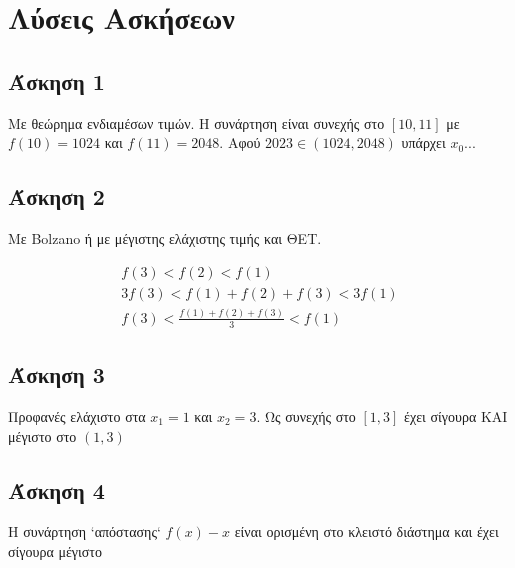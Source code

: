 \documentclass[greek]{beamer}
\begin{document}
\appendix
\section{Λύσεις Ασκήσεων}
\begin{frame}
      \tableofcontents
\end{frame}

\subsection{Άσκηση 1}
\begin{frame}[label=Λύση1]
      Με θεώρημα ενδιαμέσων τιμών. Η συνάρτηση είναι συνεχής στο $[10,11]$ με $f(10)=1024$ και $f(11)=2048$. Αφού $2023\in (1024,2048)$ υπάρχει $x_0$...

      \hyperlink{Άσκηση1}{}
\end{frame}

\subsection{Άσκηση 2}
\begin{frame}[label=Λύση2]
      Με Bolzano ή με μέγιστης ελάχιστης τιμής και ΘΕΤ.

      \begin{gather*}
            f(3)<f(2)<f(1) \\
            3f(3)<f(1)+f(2)+f(3)<3f(1) \\
            f(3)<\frac{f(1)+f(2)+f(3)}{3}<f(1)
      \end{gather*}

      \hyperlink{Άσκηση2}{}
\end{frame}

\subsection{Άσκηση 3}
\begin{frame}[label=Λύση3]
      Προφανές ελάχιστο στα $x_1=1$ και $x_2=3$. Ως συνεχής στο $[1,3]$ έχει σίγουρα ΚΑΙ μέγιστο στο $(1,3)$

      \hyperlink{Άσκηση3}{}
\end{frame}

\subsection{Άσκηση 4}
\begin{frame}[label=Λύση4]
      Η συνάρτηση `απόστασης` $f(x)-x$ είναι ορισμένη στο κλειστό διάστημα και έχει σίγουρα μέγιστο

      \hyperlink{Άσκηση4}{}
\end{frame}
\end{document}
